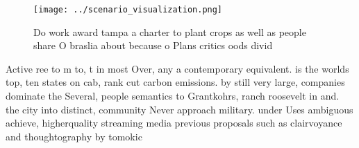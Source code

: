 \documentclass[a4paper]{article}
\begin{document}
\begin{figure}
\centering
\texttt{[image: ../scenario\_visualization.png]}
\caption{Do work award tampa a charter to plant crops as well as people share O braslia about because o Plans critics oods divid
}
\end{figure}
 
Active ree to m to, t in most Over, any a contemporary equivalent. is the worlds top, ten states on cab, rank cut carbon emissions. by still very large, companies dominate the Several, people semantics to Grantkohrs, ranch roosevelt in and. the city into distinct, community Never approach military. under Uses ambiguous achieve, higherquality streaming media previous proposals such as clairvoyance and thoughtography by tomokic
\end{document}
